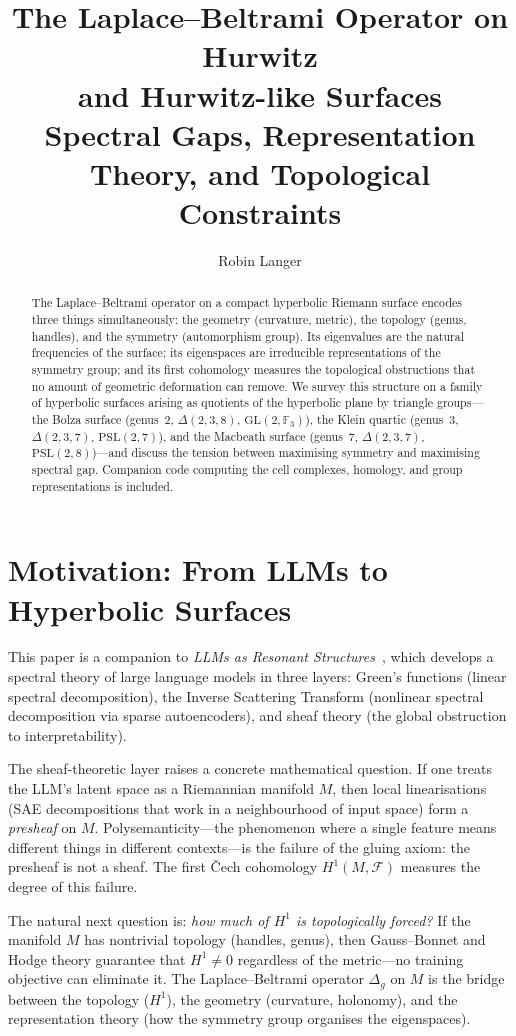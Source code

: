 \documentclass[11pt,a4paper]{article}
\title{\textbf{The Laplace--Beltrami Operator on Hurwitz\\
and Hurwitz-like Surfaces}\\[4pt]
\large Spectral Gaps, Representation Theory, and Topological Constraints}
\author{Robin Langer}
\date{}
\begin{document}
\maketitle

\begin{abstract}
The Laplace--Beltrami operator on a compact hyperbolic Riemann surface encodes
three things simultaneously: the geometry (curvature, metric), the topology
(genus, handles), and the symmetry (automorphism group). Its eigenvalues are
the natural frequencies of the surface; its eigenspaces are irreducible
representations of the symmetry group; and its first cohomology measures the
topological obstructions that no amount of geometric deformation can remove.
We survey this structure on a family of hyperbolic surfaces arising as quotients
of the hyperbolic plane by triangle groups---the Bolza surface (genus~2,
$\Delta(2,3,8)$, $\mathrm{GL}(2,\mathbb{F}_3)$), the Klein quartic (genus~3,
$\Delta(2,3,7)$, $\mathrm{PSL}(2,7)$), and the Macbeath surface (genus~7,
$\Delta(2,3,7)$, $\mathrm{PSL}(2,8)$)---and discuss the tension between
maximising symmetry and maximising spectral gap. Companion code computing the
cell complexes, homology, and group representations is included.
\end{abstract}

\section{Motivation: From LLMs to Hyperbolic Surfaces}

This paper is a companion to \emph{LLMs as Resonant Structures}~\cite{langer2026llm},
which develops a spectral theory of large language models in three layers:
Green's functions (linear spectral decomposition), the Inverse Scattering
Transform (nonlinear spectral decomposition via sparse autoencoders), and
sheaf theory (the global obstruction to interpretability).

The sheaf-theoretic layer raises a concrete mathematical question. If one treats
the LLM's latent space as a Riemannian manifold $M$, then local linearisations
(SAE decompositions that work in a neighbourhood of input space) form a
\emph{presheaf} on $M$. Polysemanticity---the phenomenon where a single feature
means different things in different contexts---is the failure of the gluing
axiom: the presheaf is not a sheaf. The first \v{C}ech cohomology $H^1(M, \mathcal{F})$
measures the degree of this failure.

The natural next question is: \emph{how much of $H^1$ is topologically forced?}
If the manifold $M$ has nontrivial topology (handles, genus), then Gauss--Bonnet
and Hodge theory guarantee that $H^1 \neq 0$ regardless of the metric---no
training objective can eliminate it. The Laplace--Beltrami operator
$\Delta_g$ on $M$ is the bridge between the topology ($H^1$), the geometry
(curvature, holonomy), and the representation theory (how the symmetry group
organises the eigenspaces).
\end{document}
